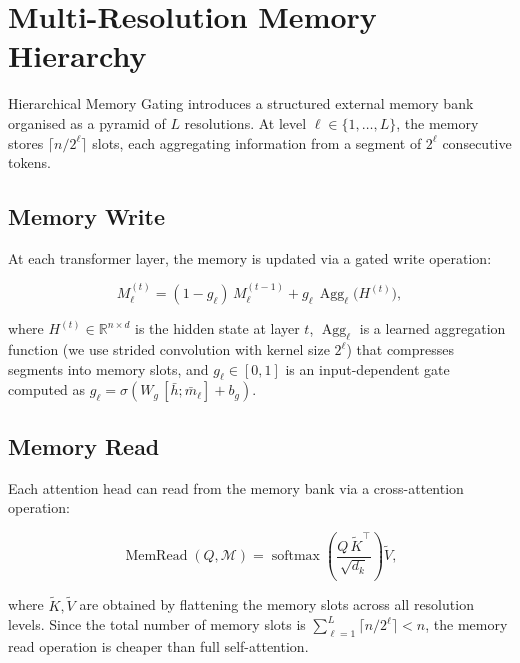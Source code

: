 \section{Multi-Resolution Memory Hierarchy}

Hierarchical Memory Gating introduces a structured external memory bank organised as a
pyramid of $L$ resolutions. At level $\ell \in \{1, \dots, L\}$, the memory stores
$\lceil n / 2^{\ell} \rceil$ slots, each aggregating information from a segment of
$2^{\ell}$ consecutive tokens.

\subsection{Memory Write}

At each transformer layer, the memory is updated via a gated write operation:

\begin{equation}
  M_{\ell}^{(t)} = (1 - g_{\ell})\, M_{\ell}^{(t-1)} + g_{\ell}\,
    \operatorname{Agg}_{\ell}\!\bigl(H^{(t)}\bigr),
  \label{eq:mem-write}
\end{equation}

where $H^{(t)} \in \mathbb{R}^{n \times d}$ is the hidden state at layer $t$,
$\operatorname{Agg}_{\ell}$ is a learned aggregation function (we use strided
convolution with kernel size $2^{\ell}$) that compresses segments into memory slots,
and $g_{\ell} \in [0,1]$ is an input-dependent gate computed as
$g_{\ell} = \sigma(W_g\, [\bar{h}; \bar{m}_{\ell}] + b_g)$.

\subsection{Memory Read}

Each attention head can read from the memory bank via a cross-attention operation:

\begin{equation}
  \operatorname{MemRead}(Q, \mathcal{M}) = \operatorname{softmax}\!\left(
    \frac{Q\, \tilde{K}^{\top}}{\sqrt{d_k}}
  \right) \tilde{V},
  \label{eq:mem-read}
\end{equation}

where $\tilde{K}, \tilde{V}$ are obtained by flattening the memory slots across all
resolution levels. Since the total number of memory slots is
$\sum_{\ell=1}^{L} \lceil n / 2^{\ell} \rceil < n$, the memory read operation is
cheaper than full self-attention.
